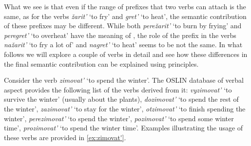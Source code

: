 What we see is that even if the range of prefixes that two verbs can attach is the same, as for the verbs \textit{\v{z}arit'} `to fry' and \textit{gret'} `to heat', the semantic contribution of these prefixes may be different. While both \textit{pere\v{z}arit'} `to burn by frying' and \textit{peregret'} `to overheat' have the meaning of , the role of the prefix  in the verbs \textit{na\v{z}arit'} `to fry a lot of' and \textit{nagret'} `to heat' seems to be not the same. In what follows we will explore a couple of verbs in detail and see how these differences in the final semantic contribution can be explained using  principles.

Consider the verb \textit{zimovat'} `to spend the winter'. The OSLIN database of verbal aspect provides the following list of the verbs derived from it: \textit{vyzimovat'} `to survive the winter' (usually about the plants), \textit{dozimovat'} `to spend the rest of the winter', \textit{zazimovat'} `to stay for the winter', \textit{otzimovat'} `to finish spending the winter', \textit{perezimovat'} `to spend the winter', \textit{pozimovat'} `to spend some winter time', \textit{prozimovat'} `to spend the winter time'. Examples illustrating the usage of these verbs are provided in \ref{ex:zimovat'}.

